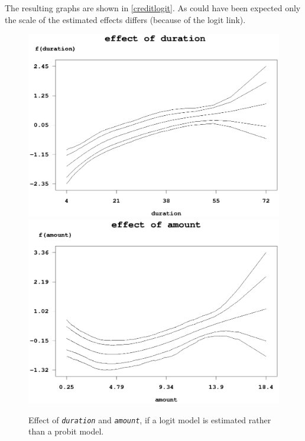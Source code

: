 The resulting graphs are shown in \autoref{creditlogit}. As could
have been expected only the scale of the estimated effects differs
(because of the logit link).

\begin{figure}[ht]
\vspace{0.5cm}
\begin{center}
\includegraphics[scale=0.65]{grafiken/credit_logit_duration.ps}

\vspace{0.5cm}
\includegraphics[scale=0.65]{grafiken/credit_logit_amount.ps}
\end{center}
{\em\caption{ \label{creditlogit} Effect of {\em\tt duration} and
{\em\tt amount}, if a logit model is estimated rather than a probit
model.}}
\end{figure}

